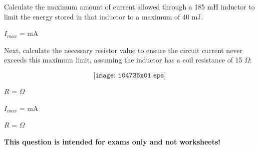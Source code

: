 

Calculate the maximum amount of current allowed through a 185 mH inductor to limit the energy stored in that inductor to a maximum of 40 mJ.

\vskip 10pt

$I_{max}$ = \underbar{\hskip 50pt} mA

\vskip 10pt

Next, calculate the necessary resistor value to ensure the circuit current never exceeds this maximum limit, assuming the inductor has a coil resistance of 15 $\Omega$:

$$\texttt{[image: i04736x01.eps]}$$

$R$ = \underbar{\hskip 50pt} $\Omega$







$I_{max}$ =  mA

\vskip 10pt

$R$ =  $\Omega$







{\bf This question is intended for exams only and not worksheets!}



